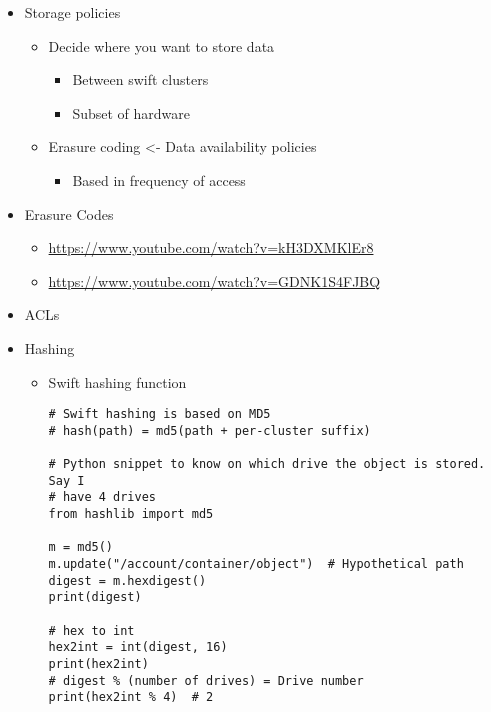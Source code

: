 \documentclass{article}
\begin{document}
\begin{itemize}
\item Storage policies
\begin{itemize}
\item Decide where you want to store data
\begin{itemize}
\item Between swift clusters
\item Subset of hardware
\end{itemize}
\item Erasure coding <- Data availability policies
\begin{itemize}
\item Based in frequency of access
\end{itemize}
\end{itemize}

\item Erasure Codes
\begin{itemize}
\item \url{https://www.youtube.com/watch?v=kH3DXMKlEr8}
\item \url{https://www.youtube.com/watch?v=GDNK1S4FJBQ}
\end{itemize}

\item ACLs

\item Hashing
\begin{itemize}
\item Swift hashing function
\begin{verbatim}
# Swift hashing is based on MD5
# hash(path) = md5(path + per-cluster suffix)

# Python snippet to know on which drive the object is stored. Say I
# have 4 drives
from hashlib import md5

m = md5()
m.update("/account/container/object")  # Hypothetical path
digest = m.hexdigest()
print(digest)

# hex to int
hex2int = int(digest, 16)
print(hex2int)
# digest % (number of drives) = Drive number
print(hex2int % 4)  # 2
\end{verbatim}
\end{itemize}
\end{itemize}
\end{document}
